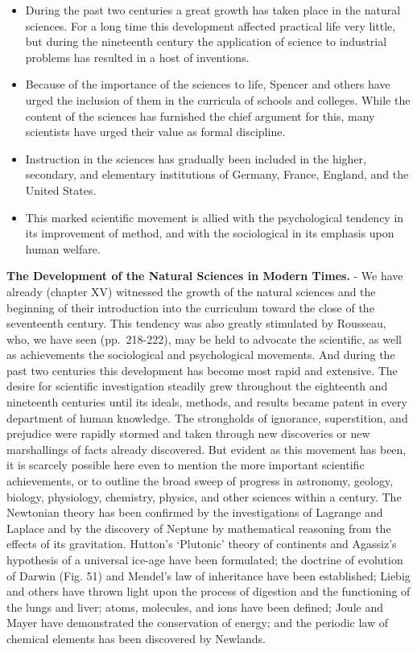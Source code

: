 \documentclass[]{book}
\providecommand{\tightlist}{%
  \setlength{\itemsep}{0pt}\setlength{\parskip}{0pt}}
\begin{document}
\begin{itemize}
\tightlist
\item
  During the past two centuries a great growth has taken place in the natural sciences. For a long time this development affected practical life very little, but during the nineteenth century the application of science to industrial problems has resulted in a host of inventions.
\item
  Because of the importance of the sciences to life, Spencer and others have urged the inclusion of them in the curricula of schools and colleges. While the content of the sciences has furnished the chief argument for this, many scientists have urged their value as formal discipline.
\item
  Instruction in the sciences has gradually been included in the higher, secondary, and elementary institutions of Germany, France, England, and the United States.
\item
  This marked scientific movement is allied with the psychological tendency in its improvement of method, and with the sociological in its emphasis upon human welfare.
\end{itemize}

\textbf{The Development of the Natural Sciences in Modern Times.} - We have already (chapter XV) witnessed the growth of the natural sciences and the beginning of their introduction into the curriculum toward the close of the seventeenth century. This tendency was also greatly stimulated by Rousseau, who, we have seen (pp.~218-222), may be held to advocate the scientific, as well as achievements the sociological and psychological movements. And during the past two centuries this development has become most rapid and extensive. The desire for scientific investigation steadily grew throughout the eighteenth and nineteenth centuries until its ideals, methods, and results became patent in every department of human knowledge. The strongholds of ignorance, superstition, and prejudice were rapidly stormed and taken through new discoveries or new marshallings of facts already discovered. But evident as this movement has been, it is scarcely possible here even to mention the more important scientific achievements, or to outline the broad sweep of progress in astronomy, geology, biology, physiology, chemistry, physics, and other sciences within a century. The Newtonian theory has been confirmed by the investigations of Lagrange and Laplace and by the discovery of Neptune by mathematical reasoning from the effects of its gravitation. Hutton's `Plutonic' theory of continents and Agassiz's hypothesis of a universal ice-age have been formulated; the doctrine of evolution of Darwin (Fig. 51) and Mendel's law of inheritance have been established; Liebig and others have thrown light upon the process of digestion and the functioning of the lungs and liver; atoms, molecules, and ions have been defined; Joule and Mayer have demonstrated the conservation of energy; and the periodic law of chemical elements has been discovered by Newlands.
\end{document}
